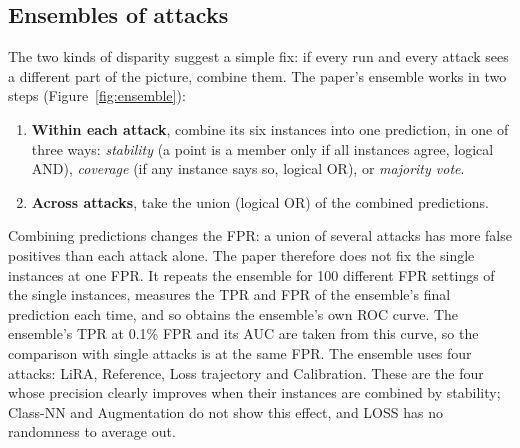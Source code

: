 \documentclass[a4paper]{article}
\begin{document}
\subsection{Ensembles of attacks}
\label{subsec:ensemble}

The two kinds of disparity suggest a simple fix: if every run and every attack sees a different part of the picture, combine them.
The paper's ensemble works in two steps (Figure~\ref{fig:ensemble}):
\begin{enumerate}
  \item \textbf{Within each attack}, combine its six instances into one prediction, in one of three ways: \emph{stability} (a point is a member only if all instances agree, logical AND), \emph{coverage} (if any instance says so, logical OR), or \emph{majority vote}.
  \item \textbf{Across attacks}, take the union (logical OR) of the combined predictions.
\end{enumerate}
Combining predictions changes the FPR: a union of several attacks has more false positives than each attack alone. The paper therefore does not fix the single instances at one FPR. It repeats the ensemble for 100 different FPR settings of the single instances, measures the TPR and FPR of the ensemble's final prediction each time, and so obtains the ensemble's own ROC curve. The ensemble's TPR at 0.1\% FPR and its AUC are taken from this curve, so the comparison with single attacks is at the same FPR.
The ensemble uses four attacks: LiRA, Reference, Loss trajectory and Calibration.
These are the four whose precision clearly improves when their instances are combined by stability; Class-NN and Augmentation do not show this effect, and LOSS has no randomness to average out.
\end{document}
